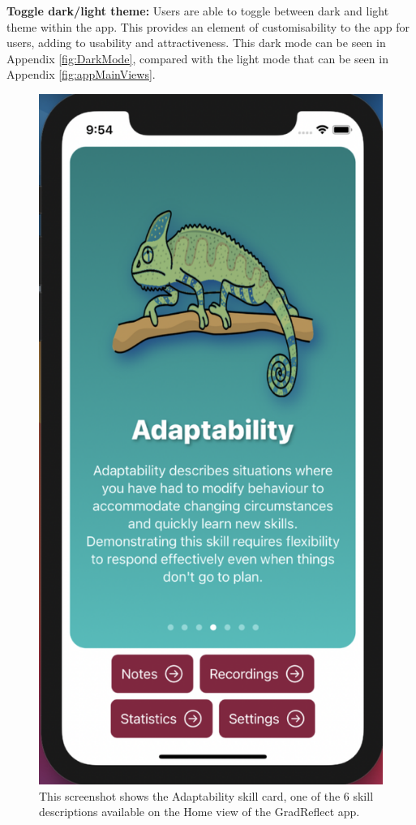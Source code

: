 \documentclass{l4proj}
\begin{document}
\textbf{Toggle dark/light theme:} Users are able to toggle between dark and light theme within the app. This provides an element of customisability to the app for users, adding to usability and attractiveness. This dark mode can be seen in Appendix \ref{fig:DarkMode}, compared with the light mode that can be seen in Appendix \ref{fig:appMainViews}.

\begin{figure}
    \centering
    \includegraphics[scale=0.3]{images/AdaptabilitySkillCard.pdf}    
    \caption{This screenshot shows the Adaptability skill card, one of the 6 skill descriptions available on the Home view of the GradReflect app.}
    \label{fig:AdaptabilitySkillCard} 
\end{figure}
\end{document}
